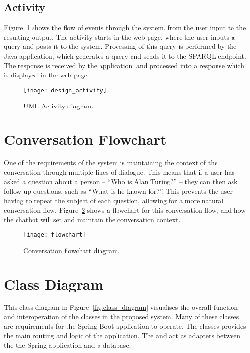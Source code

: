 \newpage
\subsection{Activity}
Figure~\ref{fig:design_activity} shows the flow of events through the system, from the user input to the resulting output. The activity starts in the web page, where the user inputs a query and posts it to the system. Processing of this query is performed by the Java application, which generates a query and sends it to the SPARQL endpoint. The response is received by the application, and processed into a response which is displayed in the web page.

\begin{figure}[h]
	\begin{center}
		\texttt{[image: design\_activity]}
	\end{center}
	\caption{UML Activity diagram.}
	\label{fig:design_activity}
\end{figure}

\section{Conversation Flowchart}
One of the requirements of the system is maintaining the context of the conversation through multiple lines of dialogue. This means that if a user has asked a question about a person -- ``Who is Alan Turing?'' -- they can then ask follow-up questions, such as ``What is he known for?''. This prevents the user having to repeat the subject of each question, allowing for a more natural conversation flow. Figure~\ref{fig:flowchart} shows a flowchart for this conversation flow, and how the chatbot will set and maintain the conversation context.

\begin{figure}[h]
	\begin{center}
		\texttt{[image: flowchart]}
	\end{center}
	\caption{Conversation flowchart diagram.}
	\label{fig:flowchart}
\end{figure}

\section{Class Diagram}
This class diagram in Figure~\ref{fig:class_diagram} visualises the overall function and interoperation of the classes in the proposed system. Many of these classes are requirements for the Spring Boot application to operate. The  classes provides the main routing and logic of the application. The  and  act as adapters between the the Spring application and a database.

